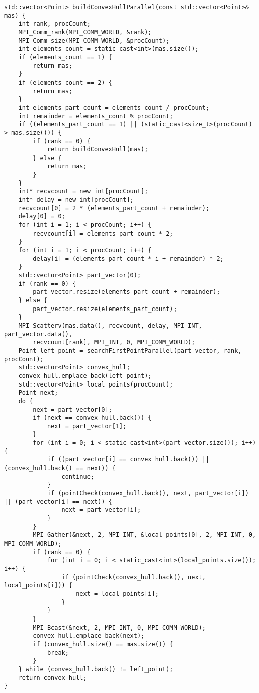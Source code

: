 \documentclass{report}
\begin{document}
\begin{lstlisting}
std::vector<Point> buildConvexHullParallel(const std::vector<Point>& mas) {
    int rank, procCount;
    MPI_Comm_rank(MPI_COMM_WORLD, &rank);
    MPI_Comm_size(MPI_COMM_WORLD, &procCount);
    int elements_count = static_cast<int>(mas.size());
    if (elements_count == 1) {
        return mas;
    }
    if (elements_count == 2) {
        return mas;
    }
    int elements_part_count = elements_count / procCount;
    int remainder = elements_count % procCount;
    if ((elements_part_count == 1) || (static_cast<size_t>(procCount) > mas.size())) {
        if (rank == 0) {
            return buildConvexHull(mas);
        } else {
            return mas;
        }
    }
    int* recvcount = new int[procCount];
    int* delay = new int[procCount];
    recvcount[0] = 2 * (elements_part_count + remainder);
    delay[0] = 0;
    for (int i = 1; i < procCount; i++) {
        recvcount[i] = elements_part_count * 2;
    }
    for (int i = 1; i < procCount; i++) {
        delay[i] = (elements_part_count * i + remainder) * 2;
    }
    std::vector<Point> part_vector(0);
    if (rank == 0) {
        part_vector.resize(elements_part_count + remainder);
    } else {
        part_vector.resize(elements_part_count);
    }
    MPI_Scatterv(mas.data(), recvcount, delay, MPI_INT, part_vector.data(),
        recvcount[rank], MPI_INT, 0, MPI_COMM_WORLD);
    Point left_point = searchFirstPointParallel(part_vector, rank, procCount);
    std::vector<Point> convex_hull;
    convex_hull.emplace_back(left_point);
    std::vector<Point> local_points(procCount);
    Point next;
    do {
        next = part_vector[0];
        if (next == convex_hull.back()) {
            next = part_vector[1];
        }
        for (int i = 0; i < static_cast<int>(part_vector.size()); i++) {
            if ((part_vector[i] == convex_hull.back()) || (convex_hull.back() == next)) {
                continue;
            }
            if (pointCheck(convex_hull.back(), next, part_vector[i]) || (part_vector[i] == next)) {
                next = part_vector[i];
            }
        }
        MPI_Gather(&next, 2, MPI_INT, &local_points[0], 2, MPI_INT, 0, MPI_COMM_WORLD);
        if (rank == 0) {
            for (int i = 0; i < static_cast<int>(local_points.size()); i++) {
                if (pointCheck(convex_hull.back(), next, local_points[i])) {
                    next = local_points[i];
                }
            }
        }
        MPI_Bcast(&next, 2, MPI_INT, 0, MPI_COMM_WORLD);
        convex_hull.emplace_back(next);
        if (convex_hull.size() == mas.size()) {
            break;
        }
    } while (convex_hull.back() != left_point);
    return convex_hull;
}


\end{lstlisting}
\end{document}
